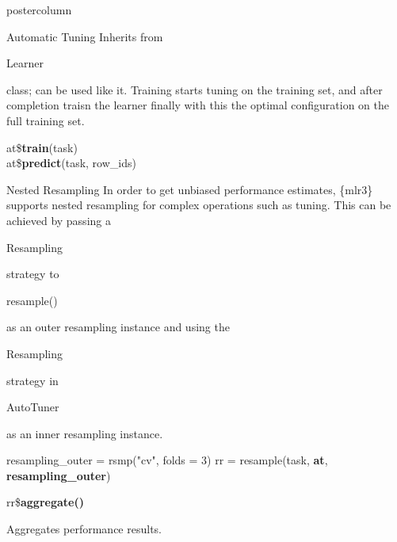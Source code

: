 \documentclass{beamer}
\newcommand{\codeinline}[1]{\begin{codeboxinline}#1\end{codeboxinline}}
\begin{document}
\begin{frame}[fragile]{}
\begin{columns}
\begin{column}{.245\textwidth}
\begin{beamercolorbox}[center]{postercolumn}
\begin{minipage}{.98\textwidth}
{\begin{myblock}{Automatic Tuning}
                            Inherits from \codeinline{Learner} class; can be used like it. Training starts tuning on the training set, and after completion traisn the learner finally with this the optimal configuration on the full training set.
							\begin{codeboxmultiline}
								at\$\textbf{train}(task)\\
								at\$\textbf{predict}(task, row\_ids)
							\end{codeboxmultiline}
						\end{myblock}
						\begin{myblock}{Nested Resampling}
							In order to get unbiased performance estimates, 
							\{mlr3\} supports nested resampling for complex operations such as tuning.
							This can be achieved by passing a \codeinline{Resampling} strategy to
							\codeinline{resample()} as an outer resampling instance and using the 
							\codeinline{Resampling} strategy in \codeinline{AutoTuner} as an 
							inner resampling instance.
							\\
							\begin{codeboxmultiline}[width=26.5cm]
								resampling\_outer = rsmp("cv", folds = 3)
								rr = resample(task, \textbf{at}, \textbf{resampling\_outer})
							\end{codeboxmultiline}
							\vspace{1em}
							\begin{codebox}
								rr\$\textbf{aggregate()}
							\end{codebox}
							Aggregates performance results.
						\end{myblock}
						\vfill}
				\end{minipage}
			\end{beamercolorbox}
		\end{column}
	\end{columns}
\end{frame}
\end{document}
